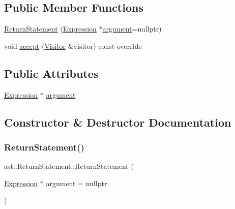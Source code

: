 \subsection*{Public Member Functions}
\begin{DoxyCompactItemize}
\item 
\hyperlink{structast_1_1_return_statement_aa66b160a544e31e72d83e0ecf36b0939}{Return\+Statement} (\hyperlink{structast_1_1_expression}{Expression} $\ast$\hyperlink{structast_1_1_return_statement_abf5147461b105e889dc9e8726791cbf4}{argument}=nullptr)
\item 
void \hyperlink{structast_1_1_return_statement_a88610e7417b6182f2c6d91ae37fa851e}{accept} (\hyperlink{structast_1_1_visitor}{Visitor} \&visitor) const override
\end{DoxyCompactItemize}
\subsection*{Public Attributes}
\begin{DoxyCompactItemize}
\item 
\hyperlink{structast_1_1_expression}{Expression} $\ast$ \hyperlink{structast_1_1_return_statement_abf5147461b105e889dc9e8726791cbf4}{argument}
\end{DoxyCompactItemize}


\subsection{Constructor \& Destructor Documentation}
\mbox{\label{structast_1_1_return_statement_aa66b160a544e31e72d83e0ecf36b0939}} 
\subsubsection{\texorpdfstring{Return\+Statement()}{ReturnStatement()}}
{\footnotesize\ttfamily ast\+::\+Return\+Statement\+::\+Return\+Statement (\begin{DoxyParamCaption}\item[{\hyperlink{structast_1_1_expression}{Expression} $\ast$}]{argument = {\ttfamily nullptr} }\end{DoxyParamCaption})\hspace{0.3cm}{\ttfamily [inline]}}



